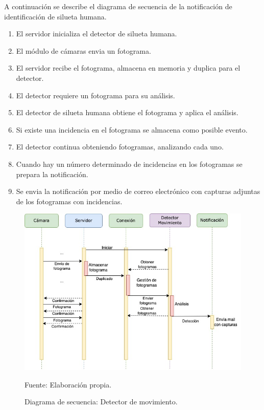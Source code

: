 A continuación se describe el diagrama de secuencia de la notificación de identificación de silueta humana.\\
\begin{enumerate}
    \item El servidor inicializa el detector de silueta humana.
    \item El módulo de cámaras envia un fotograma.    
    \item El servidor recibe el fotograma, almacena en memoria y duplica para el detector.
    \item El detector requiere un fotograma para su análisis.
    \item El detector de silueta humana obtiene el fotograma y aplica el análisis.
    \item Si existe una incidencia en el fotograma se almacena como posible evento. 
    \item El detector continua obteniendo fotogramas, analizando cada uno.
    \item Cuando hay un número determinado de incidencias en los fotogramas se prepara la notificación.
    \item Se envia la notificación por medio de correo electrónico con capturas adjuntas de los fotogramas con incidencias.
\end{enumerate}


\begin{figure}[H]
    \begin{center}
        \includegraphics[width=15cm]{img/capitulo_4/movement_detection.jpg}
    \end{center}
    \begin{center}
        \caption{Diagrama de secuencia: Detector de movimiento.}
        Fuente: Elaboración propia.
        \label{fig:diag_sec_dec_movimiento}
    \end{center}
\end{figure}

